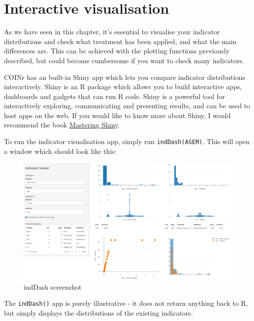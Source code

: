 \documentclass[
]{book}
\begin{document}
\hypertarget{interactive-visualisation}{%
\section{Interactive visualisation}\label{interactive-visualisation}}

As we have seen in this chapter, it's essential to visualise your indicator distributions and check what treatment has been applied, and what the main differences are. This can be achieved with the plotting functions previously described, but could become cumbersome if you want to check many indicators.

COINr has an built-in Shiny app which lets you compare indicator distributions interactively. Shiny is an R package which allows you to build interactive apps, dashboards and gadgets that can run R code. Shiny is a powerful tool for interactively exploring, communicating and presenting results, and can be used to host apps on the web. If you would like to know more about Shiny, I would recommend the book \href{https://mastering-shiny.org/index.html}{Mastering Shiny}.

To run the indicator visualisation app, simply run \texttt{indDash(ASEM)}. This will open a window which should look like this:

\begin{figure}

{\centering \includegraphics[width=1\linewidth]{images/inddash_screenshot} 

}

\caption{indDash screenshot}\label{fig:unnamed-chunk-40}
\end{figure}

The \texttt{indDash()} app is purely illustrative - it does not return anything back to R, but simply displays the distributions of the existing indicators.
\end{document}
